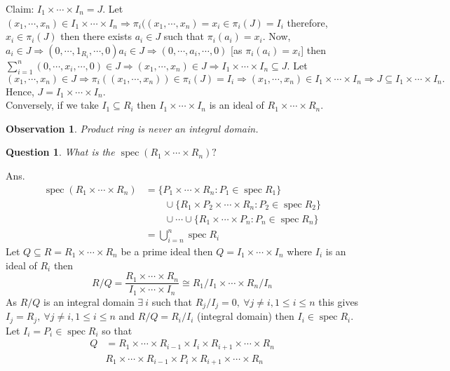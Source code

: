 \documentclass[11pt]{amsart}
\newtheorem{qns}[theorem]{Question}
\newtheorem{obs}[theorem]{Observation}
\begin{document}
Claim: $I_1\times \cdots \times I_n=J.$ Let $(x_1,\cdots ,x_n)\in I_1\times \cdots \times I_n \Rightarrow \pi_i((x_1,\cdots ,x_n)=x_i\in \pi_i(J)=I_i$ therefore, $x_i \in \pi_i(J)$ then there exists $a_i\in J$ such that $\pi_i(a_i)=x_i.$ Now, $a_i\in J \Rightarrow (0,\cdots ,1_{R_i},\cdots ,0)a_i\in J \Rightarrow (0,\cdots ,a_i,\cdots ,0)$ [as $\pi_i(a_i)=x_i$] then $\displaystyle\sum_{i=1}^n (0,\cdots ,x_i,\cdots ,0)\in J \Rightarrow (x_1,\cdots ,x_n)\in J \Rightarrow I_1\times \cdots \times I_n \subseteq J.$ Let $(x_1,\cdots ,x_n)\in J \Rightarrow \pi_i((x_1,\cdots ,x_n))\in \pi_i(J)=I_i \Rightarrow (x_1,\cdots ,x_n) \in I_1\times \cdots \times I_n \Rightarrow J\subseteq I_1\times \cdots \times I_n.$ Hence, $J=I_1\times \cdots \times I_n.$
\\
Conversely, if we take $I_1\subseteq R_i$ then $I_1\times \cdots \times I_n$ is an ideal of $R_1\times \cdots \times R_n.$
\begin{obs}
Product ring is never an integral domain.
\end{obs}
\begin{qns}
What is the $\operatorname{spec}(R_1\times \cdots \times R_n)?$
\end{qns}
Ans. \begin{align*}
\operatorname{spec}(R_1\times \cdots \times R_n)&=\{P_1\times \cdots \times R_n:P_1\in \operatorname{spec}R_1\}\\
&\quad\quad \cup \{R_1\times P_2\times \cdots \times R_n:P_2\in \operatorname{spec}R_2\}\\
&\quad\quad \cup \cdots \cup \{R_1\times \cdots \times P_n:P_n\in \operatorname{spec}R_n\}\\
&=\displaystyle\bigcup_{i=n}^n \operatorname{spec} R_i
\end{align*}
Let $Q\subseteq R=R_1\times \cdots \times R_n$ be a prime ideal then $Q=I_1\times \cdots \times I_n$ where $I_i$ is an ideal of $R_i$ then $$R/Q=\dfrac{R_1\times \cdots \times R_n}{I_1\times \cdots \times I_n}\cong R_1/I_1\times \cdots \times R_n/I_n$$ 
As $R/Q$ is an integral domain $\exists ~i$ such that $R_j/I_j=0,~\forall j\neq i,1\leq i\leq n$ this gives $I_j=R_j,~\forall j\neq i,1\leq i\leq n$ and $R/Q=R_i/I_i$ (integral domain) then $I_i\in \operatorname{spec} R_i.$ Let $I_i=P_i\in \operatorname{spec} R_i$ so that \begin{align*}
Q&=R_1\times \cdots \times R_{i-1}\times I_i\times R_{i+1}\times \cdots \times R_n\\
&R_1\times \cdots \times R_{i-1}\times P_i\times R_{i+1}\times \cdots \times R_n
\end{align*}
\end{document}
